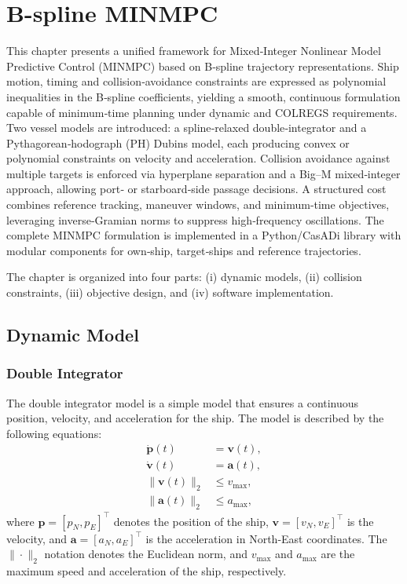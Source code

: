 
\chapter{B-spline MINMPC}\label{chap:b-spline-minmpc}

This chapter presents a unified framework for Mixed‐Integer Nonlinear Model Predictive Control (MINMPC) based on B‐spline trajectory representations. Ship motion, timing and collision‐avoidance constraints are expressed as polynomial inequalities in the B‐spline coefficients, yielding a smooth, continuous formulation capable of minimum‐time planning under dynamic and COLREGS requirements. Two vessel models are introduced: a spline‐relaxed double‐integrator and a Pythagorean‐hodograph (PH) Dubins model, each producing convex or polynomial constraints on velocity and acceleration. Collision avoidance against multiple targets is enforced via hyperplane separation and a Big–M mixed‐integer approach, allowing port‐ or starboard‐side passage decisions. A structured cost combines reference tracking, maneuver windows, and minimum‐time objectives, leveraging inverse‐Gramian norms to suppress high‐frequency oscillations. The complete MINMPC formulation is implemented in a Python/CasADi library with modular components for own‐ship, target‐ships and reference trajectories. 

The chapter is organized into four parts: (i) dynamic models, (ii) collision constraints, (iii) objective design, and (iv) software implementation.


\section{Dynamic Model}
\subsection{Double Integrator}\label{sec:double-integrator}
The double integrator model is a simple model that ensures a continuous position, velocity, and acceleration for the ship. The model is described by the following equations:
\begin{subequations}\label{eq:double-integrator}
    \begin{align}
        \dot{\mathbf{p}}(t) &= \mathbf{v}(t), \label{eq:double-integrator-x} \\
        \dot{\mathbf{v}}(t) &= \mathbf{a}(t), \label{eq:double-integrator-v} \\
        \|\mathbf{v}(t)\|_2 &\leq v_{\max}, \label{eq:double-integrator-vmax} \\
        \|\mathbf{a}(t)\|_2 &\leq a_{\max}, \label{eq:double-integrator-a}
    \end{align}
\end{subequations}
where $\mathbf{p} = [p_N, p_E]^\top$ denotes the position of the ship, $\mathbf{v} = [v_N, v_E]^\top$ is the velocity, and $\mathbf{a} = [a_N, a_E]^\top$ is the acceleration in North-East coordinates. The $\|\cdot\|_2$ notation denotes the Euclidean norm, and $v_{\max}$ and $a_{\max}$ are the maximum speed and acceleration of the ship, respectively.

